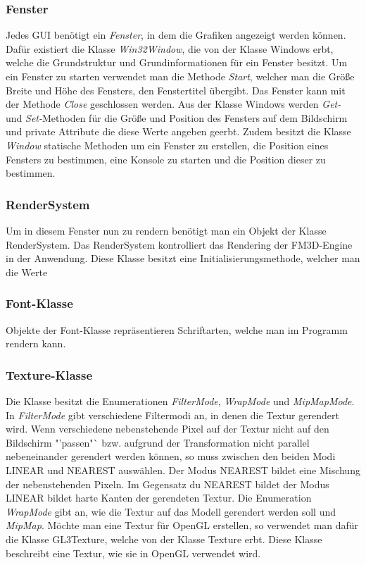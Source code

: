 \subsubsection{Fenster}
Jedes GUI benötigt ein \textit{Fenster}, in dem die Grafiken angezeigt werden können. Dafür existiert die Klasse \textit{Win32Window}, die von der Klasse Windows erbt, welche die Grundstruktur und Grundinformationen für ein Fenster besitzt. 
Um ein Fenster zu starten verwendet man die Methode \textit{Start}, welcher man die Größe Breite und Höhe des Fensters, den Fenstertitel übergibt. Das Fenster kann mit der Methode \textit{Close} geschlossen werden.
Aus der Klasse Windows werden \textit{Get-} und \textit{Set-}Methoden für die Größe und Position des Fensters auf dem Bildschirm und private Attribute die diese Werte angeben geerbt.
Zudem besitzt die Klasse \textit{Window} statische Methoden um ein Fenster zu erstellen, die Position eines Fensters zu bestimmen, eine Konsole zu starten und die Position dieser zu bestimmen.

\subsubsection{RenderSystem}
Um in diesem Fenster nun zu rendern benötigt man ein Objekt der Klasse RenderSystem. Das RenderSystem kontrolliert das Rendering der FM3D-Engine in der Anwendung. Diese Klasse besitzt eine Initialisierungsmethode, welcher man die Werte 

\subsubsection{Font-Klasse}
\label{Fontclass}
Objekte der Font-Klasse repräsentieren Schriftarten, welche man im Programm rendern kann.

\subsubsection{Texture-Klasse}
\label{Textureclass}
Die Klasse besitzt die Enumerationen \textit{FilterMode}, \textit{WrapMode} und \textit{MipMapMode}. In \textit{FilterMode} gibt verschiedene Filtermodi an, in denen die Textur gerendert wird.
Wenn verschiedene nebenstehende Pixel auf der Textur nicht auf den Bildschirm "'passen"` bzw. aufgrund der Transformation nicht parallel nebeneinander gerendert werden können, so muss zwischen den beiden Modi LINEAR und NEAREST auswählen. Der Modus NEAREST bildet eine Mischung der nebenstehenden Pixeln. 
Im Gegensatz du NEAREST bildet der Modus LINEAR bildet harte Kanten der gerendeten Textur.
Die Enumeration \textit{WrapMode} gibt an, wie die Textur auf das Modell gerendert werden soll und \textit{MipMap}.
Möchte man eine Textur für OpenGL erstellen, so verwendet man dafür die Klasse GL3Texture, welche von der Klasse Texture erbt. Diese Klasse beschreibt eine Textur, wie sie in OpenGL verwendet wird.

